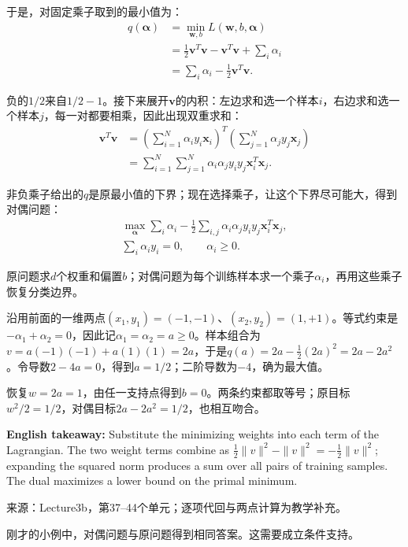 于是，对固定乘子取到的最小值为：
\[
\begin{aligned}
q(\boldsymbol\alpha)&=\min_{\mathbf w,b}L(\mathbf w,b,\boldsymbol\alpha)\\
&=\frac12\mathbf v^T\mathbf v-\mathbf v^T\mathbf v+\sum_i\alpha_i\\
&=\sum_i\alpha_i-\frac12\mathbf v^T\mathbf v.
\end{aligned}\tag{3.11a}
\]


负的\(1/2\)来自\(1/2-1\)。接下来展开\(\mathbf v\)的内积：左边求和选一个样本\(i\)，右边求和选一个样本\(j\)，每一对都要相乘，因此出现双重求和：
\[
\begin{aligned}
\mathbf v^T\mathbf v
&=\left(\sum_{i=1}^N\alpha_i y_i\mathbf x_i\right)^T
  \left(\sum_{j=1}^N\alpha_j y_j\mathbf x_j\right)\\
&=\sum_{i=1}^N\sum_{j=1}^N
  \alpha_i\alpha_j y_i y_j\mathbf x_i^T\mathbf x_j.
\end{aligned}\tag{3.11b}
\]


非负乘子给出的\(q\)是原最小值的下界；现在选择乘子，让这个下界尽可能大，得到对偶问题：
\[
\begin{gathered}\max_{\boldsymbol\alpha}\sum_i\alpha_i-\frac12\sum_{i,j}\alpha_i\alpha_jy_iy_j\mathbf x_i^T\mathbf x_j,\\
\sum_i\alpha_iy_i=0,\qquad\alpha_i\ge0.\end{gathered}\tag{3.12}
\]


原问题求\(d\)个权重和偏置\(b\)；对偶问题为每个训练样本求一个乘子\(\alpha_i\)，再用这些乘子恢复分类边界。


沿用前面的一维两点\((x_1,y_1)=(-1,-1)\)、\((x_2,y_2)=(1,+1)\)。等式约束是\(-\alpha_1+\alpha_2=0\)，因此记\(\alpha_1=\alpha_2=a\ge0\)。样本组合为\(v=a(-1)(-1)+a(1)(1)=2a\)，于是\(q(a)=2a-\tfrac12(2a)^2=2a-2a^2\)。令导数\(2-4a=0\)，得到\(a=1/2\)；二阶导数为\(-4\)，确为最大值。


恢复\(w=2a=1\)，由任一支持点得到\(b=0\)。两条约束都取等号；原目标\(w^2/2=1/2\)，对偶目标\(2a-2a^2=1/2\)，也相互吻合。


\textbf{English takeaway:} Substitute the minimizing weights into each term of the Lagrangian. The two weight terms combine as \(\tfrac12\|v\|^2-\|v\|^2=-\tfrac12\|v\|^2\); expanding the squared norm produces a sum over all pairs of training samples. The dual maximizes a lower bound on the primal minimum.


来源：Lecture3b，第37–44个单元；逐项代回与两点计算为教学补充。


刚才的小例中，对偶问题与原问题得到相同答案。这需要成立条件支持。



